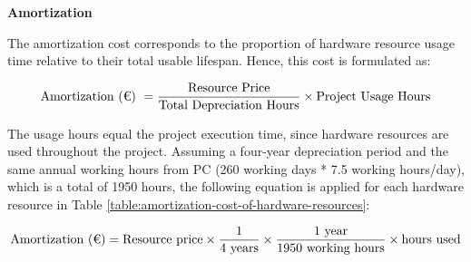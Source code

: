 \textbf{Amortization}
\vspace{-5pt}

The amortization cost corresponds to the proportion of hardware resource usage time relative to their total usable lifespan. Hence, this cost is formulated as:

\vspace{-10pt}
\small
\[
\text{Amortization (\texteuro) }= \frac{\text{Resource Price}}{\text{Total Depreciation Hours}} \times \text{Project Usage Hours}
\]

\normalsize

The usage hours equal the project execution time, since hardware resources are used throughout the project. Assuming a four-year depreciation period and the same annual working hours from PC (260 working days * 7.5 working hours/day), which is a total of 1950 hours, the following equation is applied for each hardware resource in Table \ref{table:amortization-cost-of-hardware-resources}: 

\small

\vspace{-5pt}
\[
\text{Amortization (\texteuro)} = \text{Resource price} \times 
\dfrac{1}{4 \text{ years}} \times 
\dfrac{1 \text{ year}}{1950 \text{ working hours}} \times 
\text{hours used}
\]
\normalsize

\vspace{-10pt}

\begin{table}[H]
    \renewcommand{\arraystretch}{1}
    \centering
    \footnotesize 
    \setlength{\tabcolsep}{2.5pt} 
    \normalsize 
    \caption[ Amortization cost]
    {Amortization cost. [Own creation]} 
    \vspace{-1em}
    \label{table:amortization-cost-of-hardware-resources} 
\end{table}

